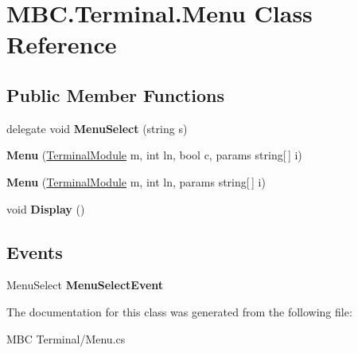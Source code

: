 \hypertarget{class_m_b_c_1_1_terminal_1_1_menu}{\section{M\-B\-C.\-Terminal.\-Menu Class Reference}
\label{class_m_b_c_1_1_terminal_1_1_menu}
}
\subsection*{Public Member Functions}
\begin{DoxyCompactItemize}
\item 
\hypertarget{class_m_b_c_1_1_terminal_1_1_menu_a023b4e88135ef70f6bb823257eedc483}{delegate void {\bfseries Menu\-Select} (string s)}\label{class_m_b_c_1_1_terminal_1_1_menu_a023b4e88135ef70f6bb823257eedc483}

\item 
\hypertarget{class_m_b_c_1_1_terminal_1_1_menu_a103f76c26d96afaf09220b9880c4e48d}{{\bfseries Menu} (\hyperlink{class_m_b_c_1_1_terminal_1_1_terminal_module}{Terminal\-Module} m, int ln, bool c, params string\mbox{[}$\,$\mbox{]} i)}\label{class_m_b_c_1_1_terminal_1_1_menu_a103f76c26d96afaf09220b9880c4e48d}

\item 
\hypertarget{class_m_b_c_1_1_terminal_1_1_menu_a9ea3131a971ce2a0c1874d4993838cf4}{{\bfseries Menu} (\hyperlink{class_m_b_c_1_1_terminal_1_1_terminal_module}{Terminal\-Module} m, int ln, params string\mbox{[}$\,$\mbox{]} i)}\label{class_m_b_c_1_1_terminal_1_1_menu_a9ea3131a971ce2a0c1874d4993838cf4}

\item 
\hypertarget{class_m_b_c_1_1_terminal_1_1_menu_aae747423db54389da74710d9843c5dc0}{void {\bfseries Display} ()}\label{class_m_b_c_1_1_terminal_1_1_menu_aae747423db54389da74710d9843c5dc0}

\end{DoxyCompactItemize}
\subsection*{Events}
\begin{DoxyCompactItemize}
\item 
\hypertarget{class_m_b_c_1_1_terminal_1_1_menu_a629ac91561a7132bf5dc3a4e0e68f088}{Menu\-Select {\bfseries Menu\-Select\-Event}}\label{class_m_b_c_1_1_terminal_1_1_menu_a629ac91561a7132bf5dc3a4e0e68f088}

\end{DoxyCompactItemize}


The documentation for this class was generated from the following file\-:\begin{DoxyCompactItemize}
\item 
M\-B\-C Terminal/Menu.\-cs\end{DoxyCompactItemize}

